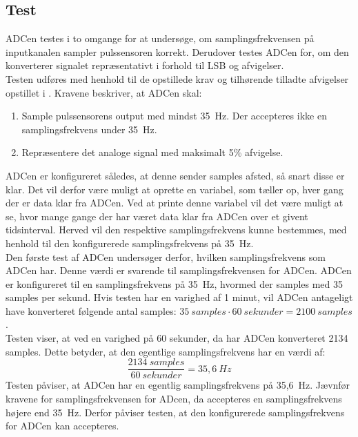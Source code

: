\subsection{Test}
ADCen testes i to omgange for at undersøge, om samplingsfrekvensen på inputkanalen sampler pulssensoren korrekt. Derudover testes ADCen for, om den konverterer signalet repræsentativt i forhold til LSB og afvigelser. \\
Testen udføres med henhold til de opstillede krav og tilhørende tilladte afvigelser opstillet i . Kravene beskriver, at ADCen skal:
\begin{enumerate}
	\item Sample pulssensorens output med mindst 35~Hz. Der accepteres ikke en samplingsfrekvens under 35~Hz. 
	\item Repræsentere det analoge signal med maksimalt 5\% afvigelse. 
\end{enumerate}

ADCen er konfigureret således, at denne sender samples afsted, så snart disse er klar. Det vil derfor være muligt at oprette en variabel, som tæller op, hver gang der er data klar fra ADCen. Ved at printe denne variabel vil det være muligt at se, hvor mange gange der har været data klar fra ADCen over et givent tidsinterval. Herved vil den respektive samplingsfrekvens kunne bestemmes, med henhold til den konfigurerede samplingsfrekvens på 35~Hz. \\
Den første test af ADCen undersøger derfor, hvilken samplingsfrekvens som ADCen har. Denne værdi er svarende til samplingsfrekvensen for ADCen. ADCen er konfigureret til en samplingsfrekvens på 35~Hz, hvormed der samples med 35 samples per sekund. Hvis testen har en varighed af 1 minut, vil ADCen antageligt have konverteret følgende antal samples: $35~samples \cdot 60~sekunder = 2100~samples$. \\
Testen viser, at ved en varighed på 60 sekunder, da har ADCen konverteret 2134 samples. Dette betyder, at den egentlige samplingsfrekvens har en værdi af:
\begin{equation}
\frac{2134~samples}{60~sekunder} = 35,6~Hz 
\end{equation}
Testen påviser, at ADCen har en egentlig samplingsfrekvens på 35,6~Hz. Jævnfør kravene for samplingsfrekvensen for ADcen, da accepteres en samplingsfrekvens højere end 35~Hz. Derfor påviser testen, at den konfigurerede samplingsfrekvens for ADCen kan accepteres. 

